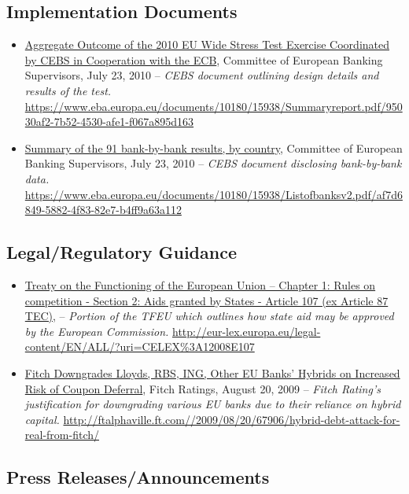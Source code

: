 \documentclass[12pt]{article}
\begin{document}
\subsection{Implementation Documents}
\begin{itemize}
\item
\ul{Aggregate Outcome of the 2010 EU Wide Stress Test Exercise Coordinated by CEBS in Cooperation with the ECB}, Committee of European Banking Supervisors, July 23, 2010 -- \emph{CEBS
 document outlining design details and results of the test.} \url{https://www.eba.europa.eu/documents/10180/15938/Summaryreport.pdf/95030af2-7b52-4530-afe1-f067a895d163}
\item
\ul{Summary of the 91 bank-by-bank results, by country}, Committee of European Banking Supervisors, July 23, 2010 -- \emph{CEBS
 document disclosing bank-by-bank data.} \url{https://www.eba.europa.eu/documents/10180/15938/Listofbanksv2.pdf/af7d6849-5882-4f83-82e7-b4ff9a63a112}
\end{itemize}

\subsection{Legal/Regulatory Guidance}

\begin{itemize}
\item
\ul{Treaty on the Functioning of the European Union -- Chapter 1: Rules on competition - Section 2: Aids granted by States - Article 107 (ex Article 87 TEC)}, -- \emph{Portion of the TFEU which outlines how state aid may be approved by the European Commission.} \url{http://eur-lex.europa.eu/legal-content/EN/ALL/?uri=CELEX\%3A12008E107}
\item
\ul{Fitch Downgrades Lloyds, RBS, ING, Other EU Banks' Hybrids on Increased Risk of Coupon Deferral}, Fitch Ratings, August 20, 2009 -- \emph{Fitch Rating's justification for downgrading various EU banks due to their reliance on hybrid capital.} \url{http://ftalphaville.ft.com//2009/08/20/67906/hybrid-debt-attack-for-real-from-fitch/}
\end{itemize}

\subsection{Press Releases/Announcements}
\end{document}
